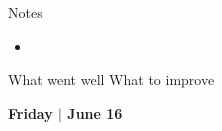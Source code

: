 \documentclass{article}
\newcommand{\mydots}{\textcolor{black!20!white}{\tiny\dotfill}}
\newcommand{\mydailyheading}[2]{{
    \fontsize{30}{32}\selectfont\bfseries\color{mypur}#1%
    \hspace{1mm}\color{black}$\vert$%
    \hspace{1mm}\fontsize{16}{18}\selectfont\bfseries\color{myblue}#2}
}
\begin{document}
\begin{day}
\begin{minipage}{1.0\textwidth}
    \begin{tcolorbox}[boxrule=1pt, width=0.95\textwidth,height=5.0in]
        Notes
        \begin{itemize}[label={}, leftmargin=*, parsep=5pt, itemsep=\parsep]
            \item \par\mydots
                \par \mydots \par \mydots \par \mydots \par \mydots \par \mydots
                \par \mydots \par \mydots \par \mydots \par \mydots \par \mydots
                \par \mydots \par \mydots \par \mydots \par \mydots \par \mydots
                \par \mydots \par \mydots \par \mydots
        \end{itemize}
    \end{tcolorbox}
\end{minipage}

\vspace{0.3cm}

\begin{minipage}{1.0\textwidth}
\begin{tcolorbox}[sidebyside, height=2in,width=0.95\textwidth]
    What went well
    \tcblower
    What to improve
\end{tcolorbox}
\end{minipage}

\newpage
\null\par\hfill\mydailyheading{Friday}{June 16}\hspace{4mm}
\par\vspace{0.5cm}


\end{day}
\end{document}
